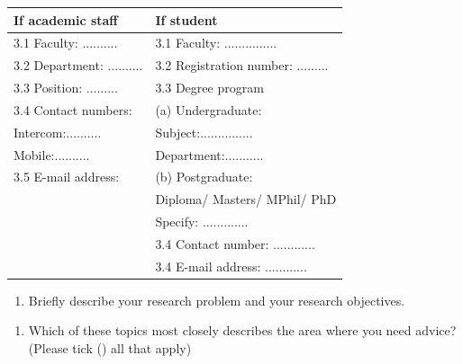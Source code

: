 \documentclass[
  a4paper]{article}
\providecommand{\tightlist}{%
  \setlength{\itemsep}{0pt}\setlength{\parskip}{0pt}}
\begin{document}
\begin{table}[!h]
\center
\begin{tabular}{p{7.5cm}|p{7.5cm}}
\hline
If academic staff & If student \\ \hline
3.1 Faculty: .......... & 3.1 Faculty: ...............  \\ 
3.2 Department: .......... & 3.2 Registration number: ......... \\ 
3.3 Position: ......... & 3.3 Degree program \\ 
3.4 Contact numbers: & \hspace{0.5cm} (a) Undergraduate: \\ 
\hspace{0.8cm} Intercom:.......... & \hspace{0.8cm} Subject:............... \\ 
\hspace{0.8cm} Mobile:.......... & \hspace{0.8cm} Department:........... \\ 
3.5 E-mail address:  & \hspace{0.5cm} (b) Postgraduate: \\ 
 & \hspace{0.8cm} Diploma/ Masters/ MPhil/ PhD \\ 
 & \hspace{0.8cm} Specify: ............. \\ 
  & 3.4 Contact number: ............  \\ 
  & 3.4 E-mail address: ............  \\ \hline
\end{tabular}
\end{table}

\begin{enumerate}
\def\labelenumi{\arabic{enumi}.}
\setcounter{enumi}{3}
\tightlist
\item
  Briefly describe your research problem and your research objectives.
\end{enumerate}

\newpage

\begin{enumerate}
\def\labelenumi{\arabic{enumi}.}
\setcounter{enumi}{4}
\tightlist
\item
  Which of these topics most closely describes the area where you need
  advice? (Please tick (\checkmark) all that apply)
\end{enumerate}
\end{document}
